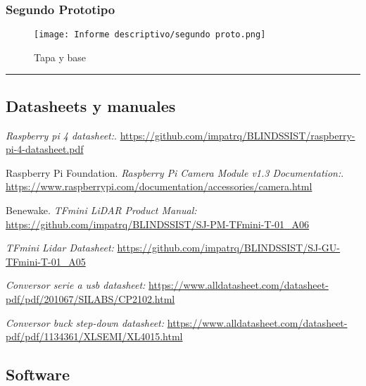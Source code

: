 \documentclass[12pt,a4paper]{article}
\newcommand{\separador}{\vspace{0.5cm}\noindent\rule{\linewidth}{0.5pt}\vspace{0.5cm}}
\begin{document}
\subsubsection{Segundo Prototipo}

\begin{figure}[H]
    \centering
    \texttt{[image: Informe descriptivo/segundo proto.png]}
    \caption{Tapa y base}
\end{figure}

\separador

\begin{thebibliography}{9}

\subsection{Datasheets y manuales}

\emph{Raspberry pi 4 datasheet:}. \href{https://github.com/impatrq/BLINDSSIST/blob/main/Hardware/raspberry-pi-4-datasheet.pdf}{https://github.com/impatrq/BLINDSSIST/raspberry-pi-4-datasheet.pdf}

Raspberry Pi Foundation. 
\emph{Raspberry Pi Camera Module v1.3 Documentation:}. \href{https://www.raspberrypi.com/documentation/accessories/camera.html}{https://www.raspberrypi.com/documentation/accessories/camera.html}

Benewake. 
\emph{TFmini LiDAR Product Manual:} \href{https://github.com/impatrq/BLINDSSIST/blob/main/Hardware/TFmini/SJ-PM-TFmini-T-01_A06%20Product%20Manual_EN.pdf}{https://github.com/impatrq/BLINDSSIST/SJ-PM-TFmini-T-01_A06}

\emph{TFmini Lidar Datasheet:}
\href{https://github.com/impatrq/BLINDSSIST/blob/main/Hardware/TFmini/SJ-GU-TFmini-T-01_A05%20Datasheet.pdf}{https://github.com/impatrq/BLINDSSIST/SJ-GU-TFmini-T-01_A05}

\emph{Conversor serie a usb datasheet:}
\href{https://www.alldatasheet.com/datasheet-pdf/pdf/201067/SILABS/CP2102.html}{https://www.alldatasheet.com/datasheet-pdf/pdf/201067/SILABS/CP2102.html}

\emph{Conversor buck step-down datasheet:}
\href{https://www.alldatasheet.com/datasheet-pdf/pdf/1134361/XLSEMI/XL4015.html}{https://www.alldatasheet.com/datasheet-pdf/pdf/1134361/XLSEMI/XL4015.html}

\subsection{Software}


\end{thebibliography}
\end{document}
